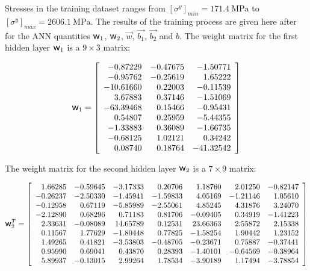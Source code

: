 \documentclass[preprint,12pt,times]{elsarticle}
\newcommand{\w}{\mbox{\large\ensuremath{\mathsf{w}}}}
\begin{document}
Stresses in the training dataset ranges from $[\sigma^y]_{min}=\qty{171.4}{\MPa}$ to $[\sigma^y]_{max}=\qty{2606.1}{\MPa}$.
The results of the training process are given here after for the ANN quantities $\w_1$, $\w_2$, $\overrightarrow{w}$, $\overrightarrow{b_1}$, $\overrightarrow{b_2}$ and $b$. The weight matrix for the first hidden layer $\w_1$ is a $9\times3$ matrix:

\begin{equation*}
\w_1=\left[
\begin{array}{rrr}
 -0.87229 & -0.47675 & -1.50771\\
 -0.95762 & -0.25619 &  1.65222\\
 -10.61660 &  0.22003 & -0.11539\\
  3.67883 &  0.37146 & -1.51069\\
 -63.39468 &  0.15466 & -0.95431\\
  0.54807 &  0.25959 & -5.44355\\
 -1.33883 &  0.36089 & -1.66735\\
 -0.68125 &  1.02121 &  0.34242\\
  0.08740 &  0.18764 & -41.32542
\end{array}\right]
\end{equation*}

The weight matrix for the second hidden layer $\w_2$ is a $7\times9$ matrix:

\begin{equation*}
\w_2^T=\left[
\begin{array}{rrrrrrrrr}
  1.66285 & -0.59645 & -3.17333 &  0.20706 &  1.18760 &  2.01250 & -0.82147\\
 -0.26237 & -2.50330 & -1.45941 & -1.59833 &  4.05169 & -1.21146 &  1.05610\\
 -0.12958 &  0.67119 & -5.85989 & -2.55061 &  4.85245 &  4.31876 &  3.24070\\
 -2.12890 &  0.68296 &  0.71183 &  0.81706 & -0.09405 &  0.34919 & -1.41223\\
  2.33631 & -0.08089 &  14.65789 &  0.12531 &  23.66363 &  2.55872 &  2.15338\\
  0.11567 &  1.77629 & -1.80448 &  0.77825 & -1.58254 &  1.90442 &  1.23152\\
  1.49265 &  0.41821 & -3.53803 & -0.48705 & -0.23671 &  0.75887 & -0.37441\\
  0.95990 &  0.69041 &  0.43870 &  0.28393 & -1.40101 & -0.64569 & -0.38964\\
  5.89937 & -0.13015 &  2.99264 &  1.78534 & -3.90189 &  1.17494 & -3.78854
\end{array}\right]
\end{equation*}
\end{document}
